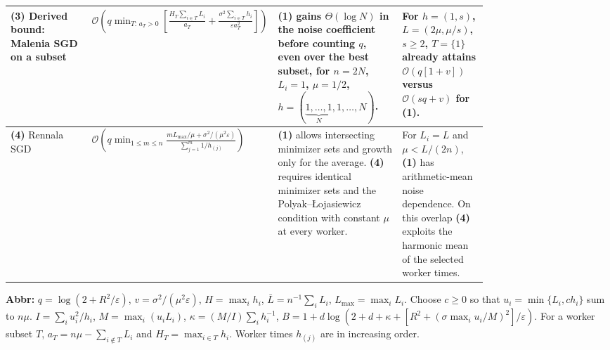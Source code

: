 \begin{table}[tp]
\begin{threeparttable}
\begin{tabularx}{\linewidth}{@{}>{\raggedright\arraybackslash}p{0.17\linewidth}>{\raggedright\arraybackslash}p{0.36\linewidth}>{\raggedright\arraybackslash}p{0.26\linewidth}>{\raggedright\arraybackslash}X@{}}
\midrule
\textbf{(3)} Derived bound: Malenia SGD on a subset \citep[Thm.~F.2]{dwiTyurin2026v1}
& $\mathcal{O}\!\left(q\min_{T:\,a_T>0}\left[\frac{H_T\sum_{i\in T}L_i}{a_T}+\frac{\sigma^2\sum_{i\in T}h_i}{\varepsilon a_T^2}\right]\right)$
& \textbf{(1)} gains $\Theta(\log N)$ in the noise coefficient before counting $q$, even over the best subset, for $n=2N$, $L_i=1$, $\mu=1/2$, $h=(\underbrace{1,\ldots,1}_{N},1,\ldots,N)$.
& For $h=(1,s)$, $L=(2\mu,\mu/s)$, $s\ge2$, $T=\{1\}$ already attains $\mathcal{O}(q[1+v])$ versus $\mathcal{O}(sq+v)$ for \textbf{(1)}. \\
\midrule
\textbf{(4)} Rennala SGD \citep[Thm.~3.8]{dwiTyurin2026v1}
& $\mathcal{O}\!\left(q\min_{1\le m\le n}\frac{m L_{\max}/\mu+\sigma^2/(\mu^2\varepsilon)}{\sum_{j=1}^m 1/h_{(j)}}\right)$
& \textbf{(1)} allows intersecting minimizer sets and growth only for the average. \textbf{(4)} requires identical minimizer sets and the Polyak--\L{}ojasiewicz condition with constant $\mu$ at every worker.
& For $L_i=L$ and $\mu<L/(2n)$, \textbf{(1)} has arithmetic-mean noise dependence. On this overlap \textbf{(4)} exploits the harmonic mean of the selected worker times. \\
\bottomrule
\end{tabularx}
\begin{tablenotes}[flushleft]\footnotesize
\item[] \textbf{Abbr:} $q=\log(2+R^2/\varepsilon)$, $v=\sigma^2/(\mu^2\varepsilon)$, $H=\max_i h_i$, $\bar L=n^{-1}\sum_i L_i$, $L_{\max}=\max_i L_i$.
Choose $c\ge0$ so that $u_i=\min\{L_i,ch_i\}$ sum to $n\mu$.
$I=\sum_i u_i^2/h_i$, $M=\max_i(u_i L_i)$, $\kappa=(M/I)\sum_i h_i^{-1}$,
$B=1+d\log\!\left(2+d+\kappa+[R^2+(\sigma\max_i u_i/M)^2]/\varepsilon\right)$.
For a worker subset $T$, $a_T=n\mu-\sum_{i\notin T}L_i$ and $H_T=\max_{i\in T}h_i$. Worker times $h_{(j)}$ are in increasing order.
\end{tablenotes}
\end{threeparttable}
\end{table}
